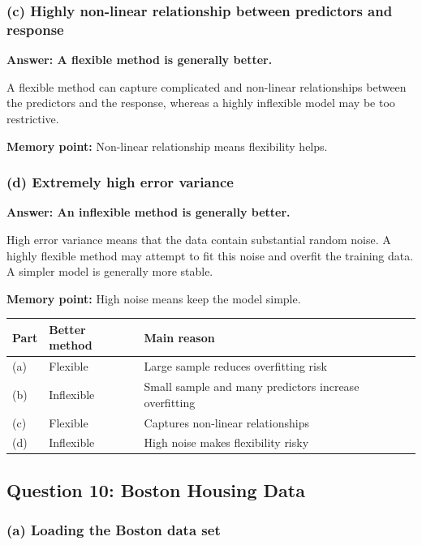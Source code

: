 \documentclass[12pt,a4paper]{article}
\begin{document}
\subsubsection*{(c) Highly non-linear relationship between predictors and response}

\textbf{Answer: A flexible method is generally better.}

A flexible method can capture complicated and non-linear relationships
between the predictors and the response, whereas a highly inflexible model
may be too restrictive.

\textbf{Memory point:} Non-linear relationship means flexibility helps.

\subsubsection*{(d) Extremely high error variance}

\textbf{Answer: An inflexible method is generally better.}

High error variance means that the data contain substantial random noise.
A highly flexible method may attempt to fit this noise and overfit the
training data. A simpler model is generally more stable.

\textbf{Memory point:} High noise means keep the model simple.

\begin{center}
\begin{tabular}{l l l}
\toprule
Part & Better method & Main reason\\
\midrule
(a) & Flexible & Large sample reduces overfitting risk\\
(b) & Inflexible & Small sample and many predictors increase overfitting\\
(c) & Flexible & Captures non-linear relationships\\
(d) & Inflexible & High noise makes flexibility risky\\
\bottomrule
\end{tabular}
\end{center}

\newpage

\subsection*{Question 10: Boston Housing Data}

\subsubsection*{(a) Loading the Boston data set}
\end{document}
